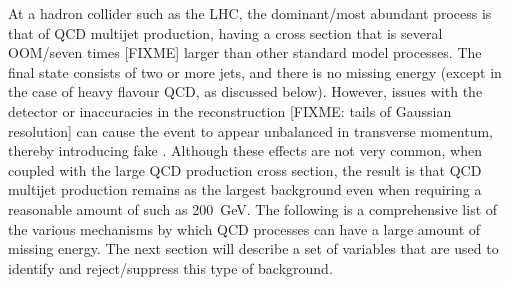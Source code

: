 
At a hadron collider such as the LHC, the dominant/most abundant process is 
that of QCD multijet production, having a cross section that is several 
OOM/seven times [FIXME] larger than other standard model processes. The final 
state consists of two or more jets, and there is no missing energy (except in 
the case of heavy flavour QCD, as discussed below). However, issues with the 
detector or inaccuracies in the reconstruction [FIXME: tails of Gaussian 
resolution] can cause the event to appear 
unbalanced in transverse momentum, thereby introducing fake \met. Although 
these effects are not very common, when coupled with the large QCD production 
cross section, the result is that QCD multijet production remains as the 
largest background even when requiring a reasonable amount of \met such as 
200~GeV. The following is a comprehensive list of the various mechanisms by 
which QCD processes can have a large amount of missing energy. The 
next section will describe a set of variables that are used to identify and 
reject/suppress this type of background.

